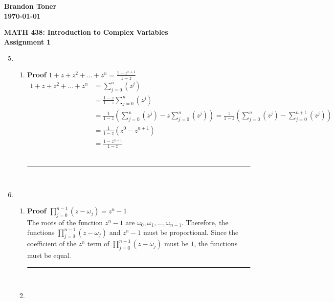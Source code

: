 \documentclass{article}%
\newenvironment{proof}[1][]{\begin{samepage}\textbf{Proof #1} \\ }{\\ \rule{0.5em}{0.5em} \end{samepage} \\}
\begin{document}
\begin{flushright}
\textbf{Brandon Toner \\
\today}
\end{flushright}

\begin{center}
\textbf{MATH 438: Introduction to Complex Variables \\
Assignment 1} \\
\end{center}

\begin{enumerate}
    \setcounter{enumi}{4}
    \item %
    \begin{enumerate}[label=\alph*]
        \item %
        \begin{proof}[$1 + z + z^2 + ... + z^n = \frac{1 - z^{n+1}}{1-z}$]
            \begin{align*}
                1 + z + z^2 + ... + z^n &= \sum\limits_{j=0}^n (z^j) \\
                                        &= \frac{1 - z}{1-z} \sum\limits_{j=0}^n (z^j) \\
                                        &= \frac{1}{1-z} \left( \sum\limits_{j=0}^n (z^j) - z \sum\limits_{j=0}^n (z^j) \right)  = \frac{1}{1-z} \left( \sum\limits_{j=0}^n (z^j) - \sum\limits_{j=0}^{n+1} (z^j) \right) \\
                                        &= \frac{1}{1-z} \left( z^0 - z^{n+1} \right) \\
                                        &= \frac{1 - z^{n+1}}{1-z}
            \end{align*}
        \end{proof}
    \end{enumerate}
    \item
    \begin{enumerate}[label=\alph*]
        \item %
        \begin{proof}[$\prod\limits_{j=0}^{n-1}{(z-\omega_j)} = z^n - 1$]
            The roots of the function $z^n - 1$ are $\omega_0, \omega_1, ... ,\omega_{n-1}$.
            Therefore, the functions $\prod\limits_{j=0}^{n-1}{(z-\omega_j)}$ and $z^n - 1$ must be proportional.
            Since the coefficient of the $z^n$ term of $\prod\limits_{j=0}^{n-1}{(z-\omega_j)}$ must be $1$, the functions must be equal.
        \end{proof}
        \item %

\end{enumerate}
\end{enumerate}
\end{document}
